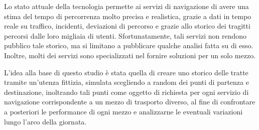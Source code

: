 Lo stato attuale della tecnologia permette ai servizi di navigazione di avere una stima del tempo di percorrenza molto precisa e realistica, grazie a dati in tempo reale su traffico, incidenti, deviazioni di percorso e grazie allo storico dei tragitti percorsi dalle loro migliaia di utenti. Sfortunatamente, tali servizi non rendono pubblico tale storico, ma si limitano a pubblicare qualche analisi fatta su di esso. Inoltre, molti dei servizi sono specializzati nel fornire soluzioni per un solo mezzo.

\cite{croci2014}

\cite{rotaris2010}

\cite{rotaris2019}

\cite{meinardi2008}


L'idea alla base di questo studio è stata quella di creare uno storico delle tratte tramite un'utenza fittizia, simulata scegliendo a random dei punti di partenza e destinazione, inoltrando tali punti come oggetto di richiesta per ogni servizio di navigazione corrispondente a un mezzo di trasporto diverso, al fine di confrontare a posteriori le performance di ogni mezzo e analizzarne le eventuali variazioni lungo l'arco della giornata.
